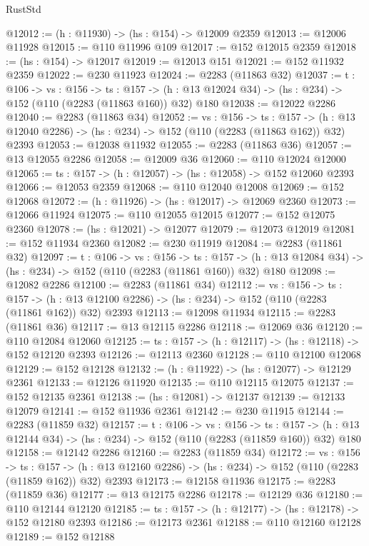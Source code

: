 \begin{lexlean}{RustStd}
\begin{coremodule}
@12012 := (h : @11930) -> (hs : @154) -> @12009 @2359
@12013 := @12006 @11928
@12015 := @110 @11996 @109
@12017 := @152 @12015 @2359
@12018 := (hs : @154) -> @12017
@12019 := @12013 @151
@12021 := @152 @11932 @2359
@12022 := @230 @11923
@12024 := @2283 (@11863 @32)
@12037 := {t : @106} ->
  {vs : @156} ->
  {ts : @157} -> (h : @13 @12024 @34) -> (hs : @234) -> @152 (@110 (@2283 (@11863 @160)) @32) @180
@12038 := @12022 @2286
@12040 := @2283 (@11863 @34)
@12052 := {vs : @156} ->
  {ts : @157} ->
  (h : @13 @12040 @2286) -> (hs : @234) -> @152 (@110 (@2283 (@11863 @162)) @32) @2393
@12053 := @12038 @11932
@12055 := @2283 (@11863 @36)
@12057 := @13 @12055 @2286
@12058 := @12009 @36
@12060 := @110 @12024 @12000
@12065 := {ts : @157} -> (h : @12057) -> (hs : @12058) -> @152 @12060 @2393
@12066 := @12053 @2359
@12068 := @110 @12040 @12008
@12069 := @152 @12068
@12072 := (h : @11926) -> (hs : @12017) -> @12069 @2360
@12073 := @12066 @11924
@12075 := @110 @12055 @12015
@12077 := @152 @12075 @2360
@12078 := (hs : @12021) -> @12077
@12079 := @12073 @12019
@12081 := @152 @11934 @2360
@12082 := @230 @11919
@12084 := @2283 (@11861 @32)
@12097 := {t : @106} ->
  {vs : @156} ->
  {ts : @157} -> (h : @13 @12084 @34) -> (hs : @234) -> @152 (@110 (@2283 (@11861 @160)) @32) @180
@12098 := @12082 @2286
@12100 := @2283 (@11861 @34)
@12112 := {vs : @156} ->
  {ts : @157} ->
  (h : @13 @12100 @2286) -> (hs : @234) -> @152 (@110 (@2283 (@11861 @162)) @32) @2393
@12113 := @12098 @11934
@12115 := @2283 (@11861 @36)
@12117 := @13 @12115 @2286
@12118 := @12069 @36
@12120 := @110 @12084 @12060
@12125 := {ts : @157} -> (h : @12117) -> (hs : @12118) -> @152 @12120 @2393
@12126 := @12113 @2360
@12128 := @110 @12100 @12068
@12129 := @152 @12128
@12132 := (h : @11922) -> (hs : @12077) -> @12129 @2361
@12133 := @12126 @11920
@12135 := @110 @12115 @12075
@12137 := @152 @12135 @2361
@12138 := (hs : @12081) -> @12137
@12139 := @12133 @12079
@12141 := @152 @11936 @2361
@12142 := @230 @11915
@12144 := @2283 (@11859 @32)
@12157 := {t : @106} ->
  {vs : @156} ->
  {ts : @157} -> (h : @13 @12144 @34) -> (hs : @234) -> @152 (@110 (@2283 (@11859 @160)) @32) @180
@12158 := @12142 @2286
@12160 := @2283 (@11859 @34)
@12172 := {vs : @156} ->
  {ts : @157} ->
  (h : @13 @12160 @2286) -> (hs : @234) -> @152 (@110 (@2283 (@11859 @162)) @32) @2393
@12173 := @12158 @11936
@12175 := @2283 (@11859 @36)
@12177 := @13 @12175 @2286
@12178 := @12129 @36
@12180 := @110 @12144 @12120
@12185 := {ts : @157} -> (h : @12177) -> (hs : @12178) -> @152 @12180 @2393
@12186 := @12173 @2361
@12188 := @110 @12160 @12128
@12189 := @152 @12188

\end{coremodule}
\end{lexlean}
